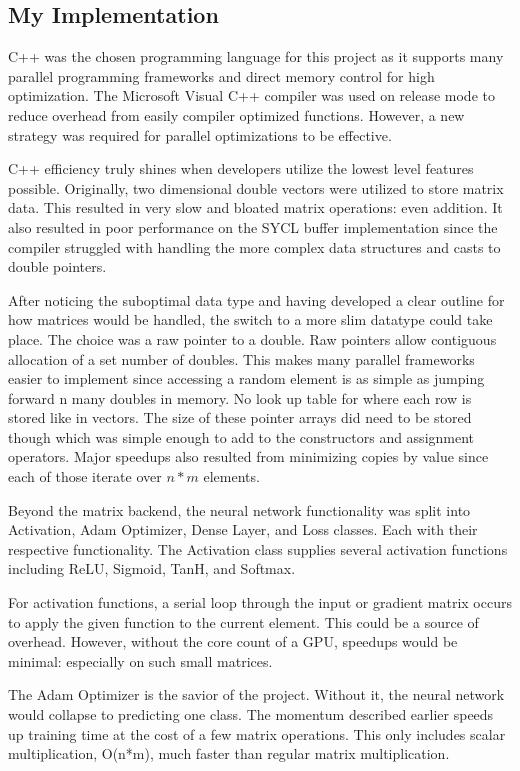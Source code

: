 \documentclass[journal]{IEEEtran}
\begin{document}
\subsection{My Implementation}
\par C++ was the chosen programming language for this project as it supports many parallel programming frameworks and direct memory control for high optimization. The Microsoft Visual C++ compiler was used on release mode to reduce overhead from easily compiler optimized functions. However, a new strategy was required for parallel optimizations to be effective.
\par C++ efficiency truly shines when developers utilize the lowest level features possible. Originally, two dimensional double vectors were utilized to store matrix data. This resulted in very slow and bloated matrix operations: even addition. It also resulted in poor performance on the SYCL buffer implementation since the compiler struggled with handling the more complex data structures and casts to double pointers. 
\par After noticing the suboptimal data type and having developed a clear outline for how matrices would be handled, the switch to a more slim datatype could take place. The choice was a raw pointer to a double. Raw pointers allow contiguous allocation of a set number of doubles. This makes many parallel frameworks easier to implement since accessing a random element is as simple as jumping forward n many doubles in memory. No look up table for where each row is stored like in vectors. The size of these pointer arrays did need to be stored though which was simple enough to add to the constructors and assignment operators. Major speedups also resulted from minimizing copies by value since each of those iterate over $n * m$ elements. 
\par Beyond the matrix backend, the neural network functionality was split into Activation, Adam Optimizer, Dense Layer, and Loss classes. Each with their respective functionality. The Activation class supplies several activation functions including ReLU, Sigmoid, TanH, and Softmax.
\par For activation functions, a serial loop through the input or gradient matrix occurs to apply the given function to the current element. This could be a source of overhead. However, without the core count of a GPU, speedups would be minimal: especially on such small matrices. 
\par The Adam Optimizer is the savior of the project. Without it, the neural network would collapse to predicting one class. The momentum described earlier speeds up training time at the cost of a few matrix operations. This only includes scalar multiplication, O(n*m), much faster than regular matrix multiplication.
\end{document}
